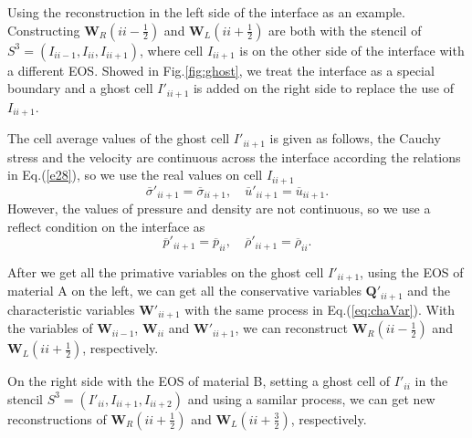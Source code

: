 \documentclass{article}
\numberwithin{equation}{section}
\numberwithin{table}{section}
\begin{document}
Using the reconstruction in the  left side of the interface as an example. Constructing $\bm{W}_R(ii-\frac{1}{2}) $ and $\bm{W}_L(ii+\frac{1}{2})$ are  both with the  stencil of  $S^3=(I_{ii-1},I_{ii}, I_{ii+1})$, where cell $I_{ii+1}$ is on the other side of the interface with a different EOS.
Showed in Fig.\ref{fig:ghost}, we treat the interface as a special boundary and a ghost cell $I'_{ii+1}$ is added on the right side to replace the use of $I_{ii+1}$. 

The cell average values of the ghost cell $I'_{ii+1}$ is given as follows, the Cauchy stress and the velocity  are  continuous across the interface according the relations in Eq.(\ref{e28}), so we use the real values on cell $I_{ii+1}$ 
\begin{equation}
  \overline{\sigma}'_{ii+1} = \overline{\sigma}_{ii+1}, \quad \overline{u}'_{ii+1} = \overline{u}_{ii+1}.
\end{equation}
However, the values of pressure and density are not continuous, so we use a reflect condition on the interface as
\begin{equation}
\overline{p}'_{ii+1} = \overline{p}_{ii}, \quad \overline{\rho}'_{ii+1} = \overline{\rho}_{ii}.
\end{equation}

After we get all the primative variables on  the ghost cell $I'_{ii+1}$,   using  the EOS of material A on the left, we can get all the conservative variables  $\bm{Q}'_{ii+1}$ and the characteristic variables $\bm{W}'_{ii+1}$ with the same process in Eq.(\ref{eq:chaVar}). With the variables of $\bm{W}_{ii-1}$, $\bm{W}_{ii}$ and  $\bm{W}'_{ii+1}$, we can reconstruct $\bm{W}_R(ii-\frac{1}{2})$ and $\bm{W}_L(ii+\frac{1}{2})$, respectively.

On the right side with the EOS of material B, setting a ghost cell of $I'_{ii}$ in the stencil $S^3 = (I'_{ii}, I_{ii+1}, I_{ii+2})$ and using a samilar process, we can get new reconstructions of $\bm{W}_R(ii+\frac{1}{2})$ and  $\bm{W}_L(ii+\frac{3}{2})$, respectively.
\end{document}
